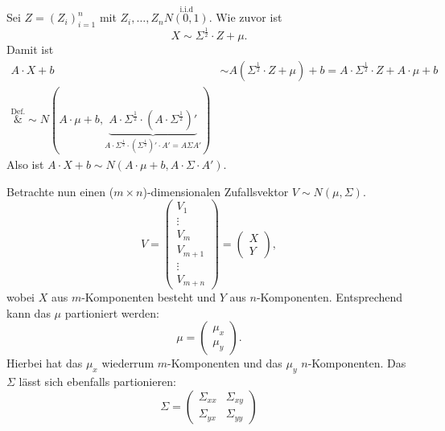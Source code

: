 \documentclass[10pt]{article}
\newcommand{\halb}{\frac{1}{2}} %
\newenvironment{BWS}[1][]
{\begin{Beweis}[frametitle=#1]}{\end{Beweis}}
\begin{document}
			\begin{BWS}[Beweis 4.0.2 (Reproduktionseigenschaften der multivariaten Normalverteilung)]
				Sei $Z = (Z_i)^n_{i=1}$ mit $Z_i, \ldots, Z_n \overset{\text{i.i.d}}{N(0,1)}$. Wie zuvor ist \begin{equation*}
					X \sim \Sigma^{\halb} \cdot Z + \mu.
				\end{equation*}
				Damit ist
				\begin{equation*}
					\begin{split}
						A \cdot X + b &\sim A(\Sigma^{\halb} \cdot Z + \mu) + b =  A \cdot \Sigma^{\halb} \cdot Z + A \cdot \mu + b\\
						\overset{\text{Def.}}&{\sim} N(A \cdot \mu +b, \underbrace{A \cdot \Sigma^{\halb} \cdot (A \cdot \Sigma^{\halb})'}_{A \cdot \Sigma^{\halb} \cdot (\Sigma^{\halb})' \cdot A' = A \Sigma A'}) 
					\end{split} 
				\end{equation*}
				Also ist $A \cdot X +b \sim N(A\cdot \mu + b, A \cdot \Sigma \cdot A')$.
			\end{BWS}
			Betrachte nun einen ($m\times n$)-dimensionalen Zufallsvektor $V \sim N(\mu, \Sigma)$. 
			\begin{equation*}
				V = \left(
				\begin{array}{c}
					V_1\\
					\vdots\\
					V_m\\
					V_{m+1}\\
					\vdots\\
					V_{m+n}
				\end{array}
				\right) = \left(
				\begin{array}{c}
				X\\
				Y
				\end{array}
				\right),
			\end{equation*}
			wobei $X$ aus $m$-Komponenten besteht und $Y$ aus $n$-Komponenten. Entsprechend kann das $\mu$ partioniert werden:
			\begin{equation*}
				\mu = \left(
				\begin{array}{c}
					\mu_x\\
					\mu_y
				\end{array}
				\right).
			\end{equation*}
			Hierbei hat das $\mu_x$ wiederrum $m$-Komponenten und das $\mu_y$ $n$-Komponenten. Das $\Sigma$ lässt sich ebenfalls partionieren:
			\begin{equation*}
				\Sigma = \begin{pmatrix}
					\Sigma_{xx} & \Sigma_{xy} \\ \Sigma_{yx} & \Sigma_{yy}
				\end{pmatrix}
			\end{equation*}
\end{document}
